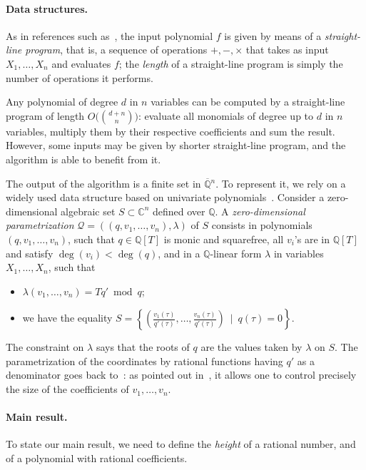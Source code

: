 \documentclass[sigconf]{acmart}
\def\C{\mathbb{C}}
\def\Q{\mathbb{Q}}
\def\scrQ{\ensuremath{\mathscr{Q}}}
\begin{document}
\paragraph*{Data structures.} As in references such
as~\cite{GiHeMoPa95,GiHaHeMoMoPa97,GiHeMoMoPa98,BaGiHeMb97,EMP}, the
input polynomial $f$ is given by means of a {\em straight-line
  program}, that is, a sequence of operations $+,-,\times$ that takes
as input $X_1,\dots,X_n$ and evaluates $f$; the {\em length} of a
straight-line program is simply the number of operations it performs.

Any polynomial of degree $d$ in $n$ variables can be computed by a
straight-line program of length $O\big ({{d+n} \choose n}\big)$:
evaluate all monomials of degree up to $d$ in $n$ variables, multiply
them by their respective coefficients and sum the result. However,
some inputs may be given by shorter straight-line program, and the
algorithm is able to benefit from it.

The output of the algorithm is a finite set in $\overline{\Q}{}^n$. To
represent it, we rely on a widely used data structure based on
univariate
polynomials~\cite{Kronecker82,Macaulay16,GiMo89,GiHeMoPa95,ABRW,GiHaHeMoMoPa97,GiHeMoMoPa98,Rouillier99}.
Consider a zero-dimensional algebraic set $S \subset \C^n$ defined
over $\Q$. A {\em zero-dimensional parametrization}
$\scrQ=((q,v_1,\dots,v_n),\lambda)$ of $S$ consists in polynomials
$(q,v_1,\dots,v_n)$, such that $q\in \Q[T]$ is monic and squarefree,
all $v_i$'s are in $\Q[T]$ and satisfy $\deg(v_i) < \deg(q)$, and in a
$\Q$-linear form $\lambda$ in variables $X_1,\dots,X_n$, such that
\begin{itemize}
\item $\lambda(v_1,\dots,v_n)=T q' \bmod q$;
\item we have the equality
  $S=\left \{\left(
      \frac{v_1(\tau)}{q'(\tau)},\dots,\frac{v_n(\tau)}{q'(\tau)}\right
    ) \ \mid \ q(\tau)=0 \right \}.$
\end{itemize}
The constraint on $\lambda$ says that the roots of $q$ are the values
taken by $\lambda$ on $S$. The parametrization of the coordinates by
rational functions having $q'$ as a denominator goes back
to~\cite{Kronecker82,Macaulay16}: as pointed out in~\cite{ABRW}, it
allows one to control precisely the size of the coefficients of
$v_1,\dots,v_n$.

\paragraph*{Main result.} To state our main result, we need to define 
the {\em height} of a rational number, and of a polynomial with
rational coefficients.
\end{document}
